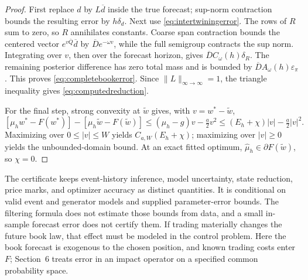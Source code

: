 \documentclass[11pt]{article}
\theoremstyle{plain}
\theoremstyle{definition}
\theoremstyle{remark}
\newcommand{\norm}[1]{\lVert#1\rVert}
\begin{document}
\begin{proof}
First replace \(d\) by \(L\overline d\) inside the true forecast;
sup-norm contraction bounds the resulting error by \(h\delta_d\).
Next use \eqref{eq:intertwiningerror}. The rows of \(R\) sum to zero,
so \(R\) annihilates constants. Coarse span contraction bounds the
centered vector \(e^{v\overline Q}\overline d\) by
\(\overline D e^{-\omega v}\), while the full semigroup contracts
the sup norm. Integrating over \(v\), then over the forecast horizon,
gives \(\overline D C_\omega(h)\delta_R\).
The remaining posterior difference has zero total mass and is
bounded by \(\overline D A_\omega(h)\varepsilon_\pi\).
This proves \eqref{eq:completebookerror}. Since
\(\norm{L}_{\infty\to\infty}=1\), the triangle inequality gives
\eqref{eq:computedreduction}.

For the final step, strong convexity at \(\widetilde w\) gives,
with \(v=w^*-\widetilde w\),
\[
 [\mu_hw^*-F(w^*)]-[\mu_h\widetilde w-F(\widetilde w)]
 \le(\mu_h-g)v-\tfrac a2 v^2
 \le(E_h+\chi)|v|-\tfrac a2|v|^2.
\]
Maximizing over \(0\le|v|\le W\) yields
\(C_{a,W}(E_h+\chi)\); maximizing over \(|v|\ge0\) yields the
unbounded-domain bound. At an exact fitted optimum,
\(\widehat\mu_h\in\partial F(\widetilde w)\), so \(\chi=0\).
\end{proof}

The certificate keeps event-history inference, model uncertainty,
state reduction, price marks, and optimizer accuracy as distinct
quantities. It is conditional on valid event and generator models and
supplied parameter-error bounds. The filtering formula does not
estimate those bounds from data, and a small in-sample forecast error
does not certify them. If trading materially changes the future book
law, that effect must be modeled in the control problem. Here the
book forecast is exogenous to the chosen position, and known trading
costs enter \(F\); Section~6 treats error in an impact operator on a
specified common probability space.
\end{document}
